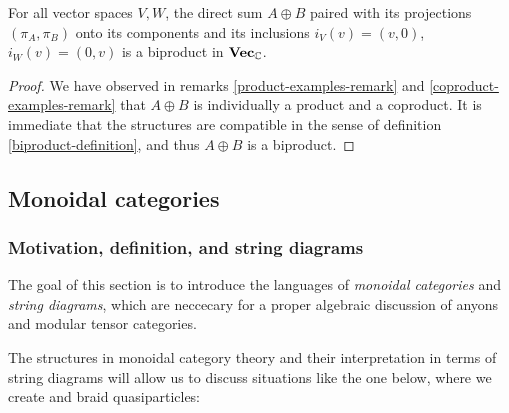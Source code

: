 \begin{prop} For all vector spaces $V,W$, the direct sum $A\oplus B$ paired with its projections $(\pi_A,\pi_B)$ onto its components and its inclusions $i_V(v)=(v,0)$, $i_W(v)=(0,v)$ is a biproduct in ${\bf Vec}_{{\mathbb C}}$.
\end{prop}
\begin{proof} We have observed in remarks \ref{product-examples-remark} and \ref{coproduct-examples-remark} that $A\oplus B$ is individually a product and a coproduct. It is immediate that the structures are compatible in the sense of definition \ref{biproduct-definition}, and thus $A\oplus B$ is a biproduct.
\end{proof}

\subsection{Monoidal categories}

\subsubsection{Motivation, definition, and string diagrams}

The goal of this section is to introduce the languages of {\em monoidal categories} and {\em string diagrams}, which are neccecary for a proper algebraic discussion of anyons and modular tensor categories.

The structures in monoidal category theory and their interpretation in terms of string diagrams will allow us to discuss situations like the one below, where we create and braid quasiparticles:

